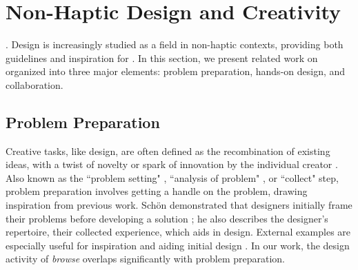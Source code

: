


%
%
\section{Non-Haptic Design and Creativity }
.
Design is increasingly studied as a field in non-haptic contexts, providing both guidelines and inspiration for \haxd.
In this section, we present related work on  organized into three major elements: problem preparation, hands-on design, and collaboration.

\subsection{Problem Preparation}
Creative tasks, like design, are often defined as the recombination of existing ideas, with a twist of novelty or spark of innovation by the individual creator \cite{Warr2005}.
Also known as the ``problem setting" \cite{Schon1982}, ``analysis of problem" \cite{Warr2005}, or ``collect" \cite{Shneiderman2000} step, problem preparation involves getting a handle on the problem,  drawing inspiration from previous work. %
Sch\"{o}n demonstrated that designers initially frame their problems before developing a solution \cite{Schon1982};
he also describes the designer's repertoire, their collected experience, which aids in design.
External examples are especially useful for inspiration and aiding initial design \cite{Herring2009,Buxton2007}. 
In our work, the design activity of \emph{browse} overlaps significantly with problem preparation.

